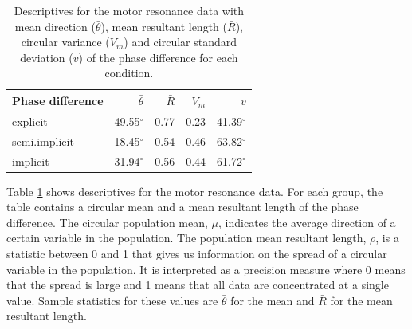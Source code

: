 \documentclass[11pt,]{article}
\begin{document}
\begin{table}
\centering
\caption{Descriptives for the motor resonance data with mean direction ($\bar{\theta}$), mean resultant length ($\bar{R}$), circular variance ($V_m$) and circular standard deviation ($v$) of the phase difference for each condition.} 
\begin{tabular}{lrrrr}
  \hline\noalign{\smallskip}
Phase difference & $\bar{\theta}$ & $\bar{R}$ & $V_m$ & $v$ \\ \hline\noalign{\smallskip}
explicit         & 49.55$^{\circ}$ & 0.77 & 0.23 & 41.39$^{\circ}$\\ 
semi.implicit    & 18.45$^{\circ}$ & 0.54 & 0.46 & 63.82$^{\circ}$\\
implicit         & 31.94$^{\circ}$ & 0.56 & 0.44 & 61.72$^{\circ}$\\
   \hline
\end{tabular}
\label{TableDescriptives}
\end{table}

Table \ref{TableDescriptives} shows descriptives for the motor resonance
data. For each group, the table contains a circular mean and a mean
resultant length of the phase difference. The circular population mean,
\(\mu\), indicates the average direction of a certain variable in the
population. The population mean resultant length, \(\rho\), is a
statistic between 0 and 1 that gives us information on the spread of a
circular variable in the population. It is interpreted as a precision
measure where 0 means that the spread is large and 1 means that all data
are concentrated at a single value. Sample statistics for these values
are \(\bar{\theta}\) for the mean and \(\bar{R}\) for the mean resultant
length.
\end{document}
